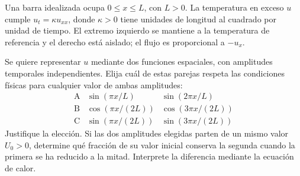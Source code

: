 Una barra idealizada ocupa \(0\le x\le L\), con \(L>0\). La temperatura en exceso \(u\) cumple \(u_t=\kappa u_{xx}\), donde \(\kappa>0\) tiene unidades de longitud al cuadrado por unidad de tiempo. El extremo izquierdo se mantiene a la temperatura de referencia y el derecho está aislado; el flujo es proporcional a \(-u_x\).

Se quiere representar \(u\) mediante dos funciones espaciales, con amplitudes temporales independientes. Elija cuál de estas parejas respeta las condiciones físicas para cualquier valor de ambas amplitudes:
\[
\begin{array}{c|cc}
\mathrm A&\sin(\pi x/L)&\sin(2\pi x/L)\\
\mathrm B&\cos(\pi x/(2L))&\cos(3\pi x/(2L))\\
\mathrm C&\sin(\pi x/(2L))&\sin(3\pi x/(2L))
\end{array}
\]
Justifique la elección. Si las dos amplitudes elegidas parten de un mismo valor \(U_0>0\), determine qué fracción de su valor inicial conserva la segunda cuando la primera se ha reducido a la mitad. Interprete la diferencia mediante la ecuación de calor.
